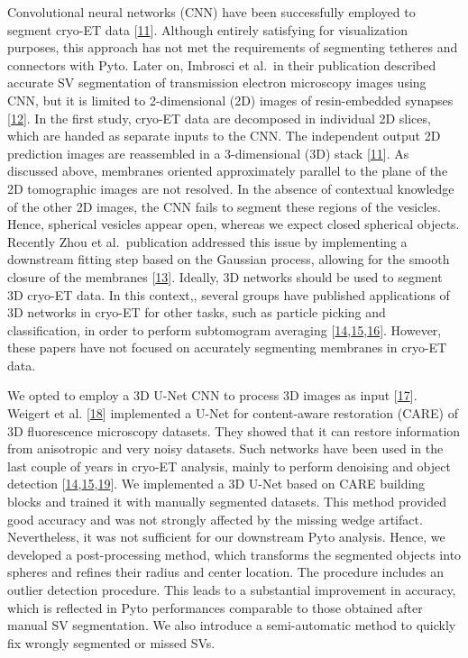 Convolutional neural networks (CNN) have been successfully employed to segment cryo-ET data {[}\protect\hyperlink{ref-GNLHO53d}{11}{]}.
Although entirely satisfying for visualization purposes, this approach has not met the requirements of segmenting tetheres and connectors with Pyto.
Later on, Imbrosci et al.~in their publication described accurate SV segmentation of transmission electron microscopy images using CNN, but it is limited to 2-dimensional (2D) images of resin-embedded synapses {[}\protect\hyperlink{ref-RdPTGoZx}{12}{]}.
In the first study, cryo-ET data are decomposed in individual 2D slices, which are handed as separate inputs to the CNN.
The independent output 2D prediction images are reassembled in a 3-dimensional (3D) stack {[}\protect\hyperlink{ref-GNLHO53d}{11}{]}.
As discussed above, membranes oriented approximately parallel to the plane of the 2D tomographic images are not resolved.
In the absence of contextual knowledge of the other 2D images, the CNN fails to segment these regions of the vesicles.
Hence, spherical vesicles appear open, whereas we expect closed spherical objects.
Recently Zhou et al.~publication addressed this issue by implementing a downstream fitting step based on the Gaussian process, allowing for the smooth closure of the membranes {[}\protect\hyperlink{ref-pMX2OxF7}{13}{]}.
Ideally, 3D networks should be used to segment 3D cryo-ET data.
In this context,, several groups have published applications of 3D networks in cryo-ET for other tasks, such as particle picking and classification, in order to perform subtomogram averaging {[}\protect\hyperlink{ref-xhywoibB}{14},\protect\hyperlink{ref-VobzV1Lb}{15},\protect\hyperlink{ref-NGTzBMdU}{16}{]}.
However, these papers have not focused on accurately segmenting membranes in cryo-ET data.

We opted to employ a 3D U-Net CNN to process 3D images as input {[}\protect\hyperlink{ref-D7hXMn0y}{17}{]}.
Weigert et al. {[}\protect\hyperlink{ref-12G712Zky}{18}{]} implemented a U-Net for content-aware restoration (CARE) of 3D fluorescence microscopy datasets.
They showed that it can restore information from anisotropic and very noisy datasets.
Such networks have been used in the last couple of years in cryo-ET analysis, mainly to perform denoising and object detection {[}\protect\hyperlink{ref-xhywoibB}{14},\protect\hyperlink{ref-VobzV1Lb}{15},\protect\hyperlink{ref-vFGVscEl}{19}{]}.
We implemented a 3D U-Net based on CARE building blocks and trained it with manually segmented datasets.
This method provided good accuracy and was not strongly affected by the missing wedge artifact.
Nevertheless, it was not sufficient for our downstream Pyto analysis.
Hence, we developed a post-processing method, which transforms the segmented objects into spheres and refines their radius and center location. The procedure includes an outlier detection procedure.
This leads to a substantial improvement in accuracy, which is reflected in Pyto performances comparable to those obtained after manual SV segmentation.
We also introduce a semi-automatic method to quickly fix wrongly segmented or missed SVs.

